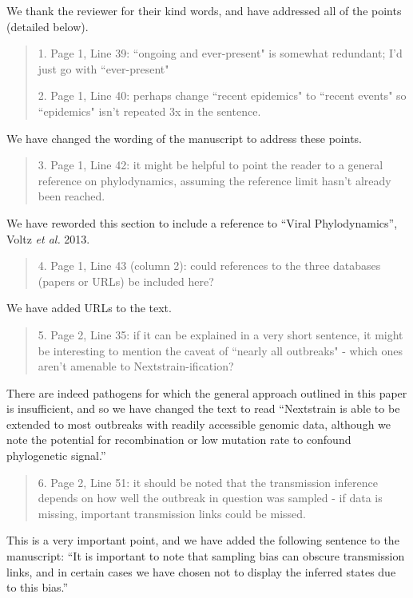 \documentclass[12pt,a4paper]{article}
\begin{document}
We thank the reviewer for their kind words, and have addressed all of the points (detailed below).

\begin{quote}
1. Page 1, Line 39: ``ongoing and ever-present" is somewhat redundant; I'd just go with ``ever-present"

2. Page 1, Line 40: perhaps change ``recent epidemics" to ``recent events" so ``epidemics" isn't repeated 3x in the sentence.
\end{quote}
We have changed the wording of the manuscript to address these points.

\begin{quote}
3. Page 1, Line 42: it might be helpful to point the reader to a general reference on phylodynamics, assuming the reference limit hasn't already been reached.
\end{quote}
We have reworded this section to include a reference to ``Viral Phylodynamics'', Voltz \textit{et al.} 2013.

\begin{quote}
4. Page 1, Line 43 (column 2): could references to the three databases (papers or URLs) be included here?
\end{quote}
We have added URLs to the text.

\begin{quote}
5. Page 2, Line 35: if it can be explained in a very short sentence, it might be interesting to mention the caveat of ``nearly all outbreaks" - which ones aren't amenable to Nextstrain-ification?
\end{quote}
There are indeed pathogens for which the general approach outlined in this paper is insufficient, and so we have changed the text to read ``Nextstrain is able to be extended to most outbreaks with readily accessible genomic data, although we note the potential for recombination or low mutation rate to confound phylogenetic signal.''


\begin{quote}
6. Page 2, Line 51: it should be noted that the transmission inference depends on how well the outbreak in question was sampled - if data is missing, important transmission links could be missed.
\end{quote}
This is a very important point, and we have added the following sentence to the manuscript: ``It is important to note that sampling bias can obscure transmission links, and in certain cases we have chosen not to display the inferred states due to this bias.''
\end{document}
